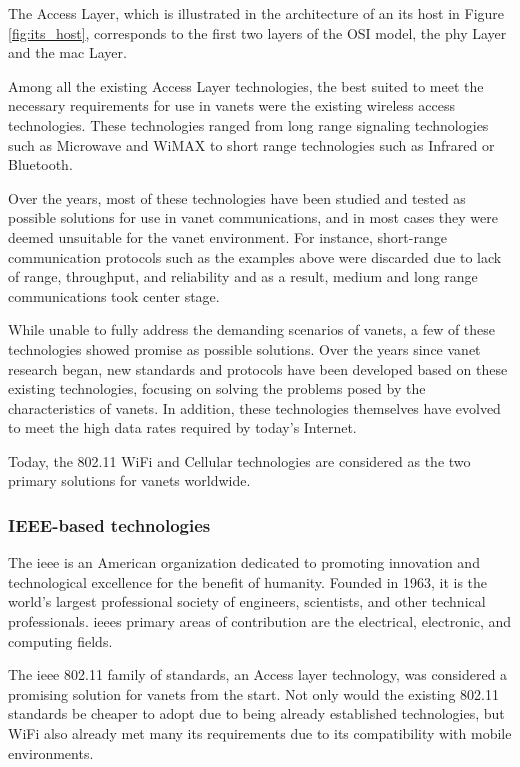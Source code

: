 The Access Layer, which is illustrated in the architecture of an \gls{its} host in Figure \ref{fig:its_host}, corresponds to the first two layers of the OSI model, the \gls{phy} Layer and the \gls{mac} Layer\cite{etsi_intelligent_2020}.

Among all the existing Access Layer technologies, the best suited to meet the necessary requirements for use in \glspl{vanet} were the existing wireless access technologies\cite{al-sultan_comprehensive_2014}. These technologies ranged from long range signaling technologies such as Microwave and WiMAX to short range technologies such as Infrared or Bluetooth\cite{anwer_survey_2014}.

Over the years, most of these technologies have been studied and tested as possible solutions for use in \gls{vanet} communications, and in most cases they were deemed unsuitable for the \gls{vanet} environment. For instance, short-range communication protocols such as the examples above were discarded due to lack of range, throughput, and reliability and as a result, medium and long range communications took center stage.

While unable to fully address the demanding scenarios of \glspl{vanet}, a few of these technologies showed promise as possible solutions. Over the years since \gls{vanet} research began, new standards and protocols have been developed based on these existing technologies, focusing on solving the problems posed by the characteristics of \glspl{vanet}. In addition, these technologies themselves have evolved to meet the high data rates required by today's Internet.

Today, the  802.11 WiFi and Cellular technologies are considered as the two primary solutions for \glspl{vanet} worldwide.

\subsubsection{IEEE-based technologies}
The \gls{ieee} is an American organization dedicated to promoting innovation and technological excellence for the benefit of humanity. Founded in 1963, it is the world's largest professional society of engineers, scientists, and other technical professionals. \glspl{ieee} primary areas of contribution are the electrical, electronic, and computing fields\cite{noauthor_history_nodate}.

The \gls{ieee} 802.11 family of standards, an Access layer technology, was considered a promising solution for \glspl{vanet} from the start. Not only would the existing 802.11 standards be cheaper to adopt due to being already established technologies, but WiFi also already met many \gls{its} requirements due to its compatibility with mobile environments\cite{rohde__schwarz_intelligent_2019}.

